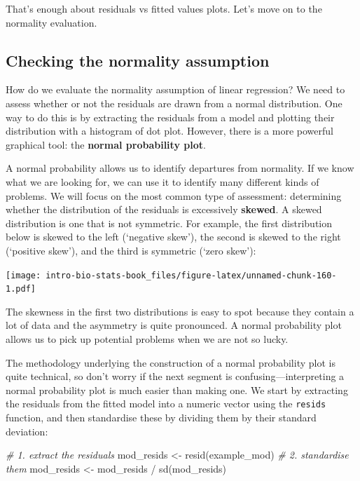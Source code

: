 \documentclass[
]{book}
\newenvironment{Shaded}{\begin{snugshade}}{\end{snugshade}}
\newcommand{\CommentTok}[1]{\textcolor[rgb]{0.56,0.35,0.01}{\textit{#1}}}
\newcommand{\FunctionTok}[1]{\textcolor[rgb]{0.00,0.00,0.00}{#1}}
\newcommand{\NormalTok}[1]{#1}
\newcommand{\OtherTok}[1]{\textcolor[rgb]{0.56,0.35,0.01}{#1}}
\newcommand{\SpecialCharTok}[1]{\textcolor[rgb]{0.00,0.00,0.00}{#1}}
\begin{document}
That's enough about residuals vs fitted values plots. Let's move on to the normality evaluation.

\hypertarget{checking-the-normality-assumption}{%
\subsection{Checking the normality assumption}\label{checking-the-normality-assumption}}

How do we evaluate the normality assumption of linear regression? We need to assess whether or not the residuals are drawn from a normal distribution. One way to do this is by extracting the residuals from a model and plotting their distribution with a histogram of dot plot. However, there is a more powerful graphical tool: the \textbf{normal probability plot}.

A normal probability allows us to identify departures from normality. If we know what we are looking for, we can use it to identify many different kinds of problems. We will focus on the most common type of assessment: determining whether the distribution of the residuals is excessively \textbf{skewed}. A skewed distribution is one that is not symmetric. For example, the first distribution below is skewed to the left (`negative skew'), the second is skewed to the right (`positive skew'), and the third is symmetric (`zero skew'):

\texttt{[image: intro-bio-stats-book\_files/figure-latex/unnamed-chunk-160-1.pdf]}

The skewness in the first two distributions is easy to spot because they contain a lot of data and the asymmetry is quite pronounced. A normal probability plot allows us to pick up potential problems when we are not so lucky.

The methodology underlying the construction of a normal probability plot is quite technical, so don't worry if the next segment is confusing---interpreting a normal probability plot is much easier than making one. We start by extracting the residuals from the fitted model into a numeric vector using the \texttt{resids} function, and then standardise these by dividing them by their standard deviation:

\begin{Shaded}
\begin{Highlighting}[]
\CommentTok{\# 1. extract the residuals}
\NormalTok{mod\_resids }\OtherTok{\textless{}{-}} \FunctionTok{resid}\NormalTok{(example\_mod)}
\CommentTok{\# 2. standardise them}
\NormalTok{mod\_resids }\OtherTok{\textless{}{-}}\NormalTok{ mod\_resids }\SpecialCharTok{/} \FunctionTok{sd}\NormalTok{(mod\_resids)}
\end{Highlighting}
\end{Shaded}
\end{document}
